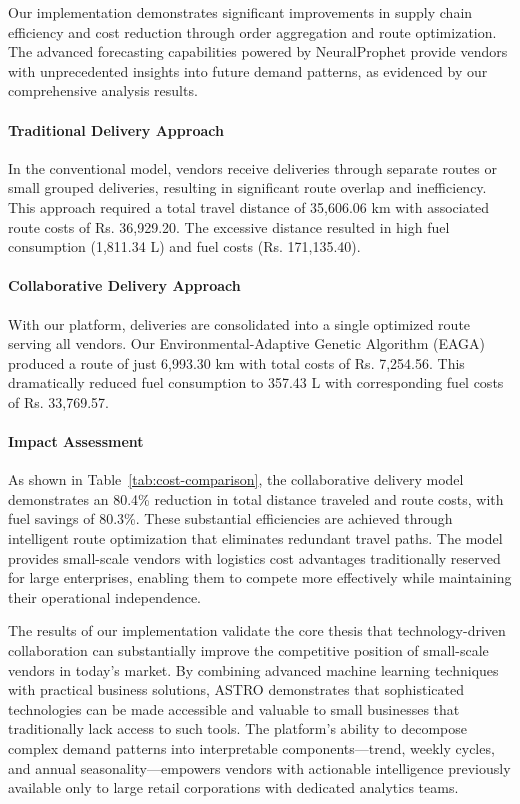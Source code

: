 Our implementation demonstrates significant improvements in supply chain efficiency and cost reduction through order aggregation and route optimization. The advanced forecasting capabilities powered by NeuralProphet provide vendors with unprecedented insights into future demand patterns, as evidenced by our comprehensive analysis results.

\paragraph{Traditional Delivery Approach} In the conventional model, vendors receive deliveries through separate routes or small grouped deliveries, resulting in significant route overlap and inefficiency. This approach required a total travel distance of 35,606.06 km with associated route costs of Rs. 36,929.20. The excessive distance resulted in high fuel consumption (1,811.34 L) and fuel costs (Rs. 171,135.40).

\paragraph{Collaborative Delivery Approach} With our platform, deliveries are consolidated into a single optimized route serving all vendors. Our Environmental-Adaptive Genetic Algorithm (EAGA) produced a route of just 6,993.30 km with total costs of Rs. 7,254.56. This dramatically reduced fuel consumption to 357.43 L with corresponding fuel costs of Rs. 33,769.57.

\paragraph{Impact Assessment} As shown in Table~\ref{tab:cost-comparison}, the collaborative delivery model demonstrates an 80.4\% reduction in total distance traveled and route costs, with fuel savings of 80.3\%. These substantial efficiencies are achieved through intelligent route optimization that eliminates redundant travel paths. The model provides small-scale vendors with logistics cost advantages traditionally reserved for large enterprises, enabling them to compete more effectively while maintaining their operational independence.

\par The results of our implementation validate the core thesis that technology-driven collaboration can substantially improve the competitive position of small-scale vendors in today's market. By combining advanced machine learning techniques with practical business solutions, ASTRO demonstrates that sophisticated technologies can be made accessible and valuable to small businesses that traditionally lack access to such tools. The platform's ability to decompose complex demand patterns into interpretable components—trend, weekly cycles, and annual seasonality—empowers vendors with actionable intelligence previously available only to large retail corporations with dedicated analytics teams.

